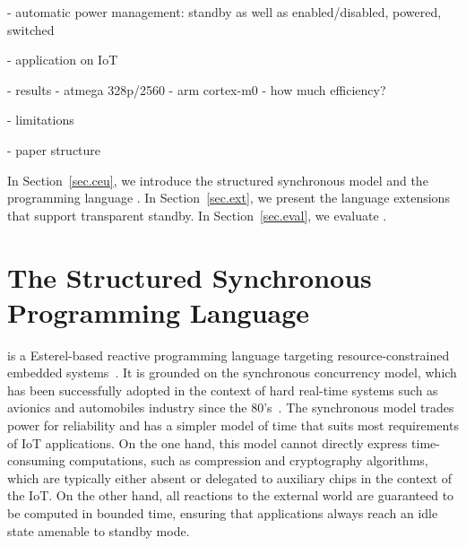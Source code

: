 - automatic power management: standby as well as enabled/disabled, powered, switched

- application on IoT

- results
    - atmega 328p/2560
    - arm cortex-m0
    - how much efficiency?

- limitations

- paper structure

In Section~\ref{sec.ceu}, we introduce the structured synchronous model and the
programming language \CEU.
In Section~\ref{sec.ext}, we present the language extensions that support
transparent standby.
In Section~\ref{sec.eval}, we evaluate .

\section{The Structured Synchronous Programming Language \CEU}

\begin{comment}
- structured programming
- lexical scope

In summary:

Reactive: code executes in reactions to events

Synchronous: reactions run to completion, i.e., there's no implicit preemption or real parallelism (this avoids explicit synchronization: locks, queues, etc)

Structured: programs use structured control mechanisms, such as "await" (to suspend a line of execution), and "par" (to combine multiple awaiting lines of execution)

Structured programming avoids deep nesting of callbacks letting you write programs in direct/sequential style. In addition, when a line of execution is aborted, all allocated resources are safely released.

In comparison to FRP/dataflow, it is more imperative supporting sequences/loops/conditionals/parallels. The notion of (multiple) program counter is explicit. Also, everything is lexically scoped, there's no GC involved.

In comparison to promises/futures, it provides lexical parallel constructs, allowing the branches to share local variables and, more importantly, supporting safe abortion of code (with the "par/or").
\end{comment}

\CEU is a Esterel-based\cite{ceu.tecs17} reactive programming language
targeting resource-constrained embedded systems~\cite{ceu.sensys13}.
%
It is grounded on the synchronous concurrency model, which has been
successfully adopted in the context of hard real-time systems such as avionics
and automobiles industry since the 80's~\cite{rp.twelve}.
%
The synchronous model trades power for reliability and has a simpler model
of time that suits most requirements of IoT applications.
%
On the one hand, this model cannot directly express time-consuming
computations, such as compression and cryptography algorithms, which are
typically either absent or delegated to auxiliary chips in the context of the
IoT.
%
On the other hand, all reactions to the external world are guaranteed to be
computed in bounded time, ensuring that applications always reach an idle state
amenable to standby mode.


